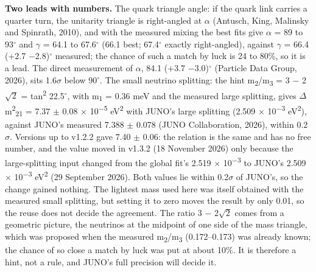 \documentclass[
  11pt,
]{article}
\begin{document}
\textbf{Two leads with numbers.} The quark triangle angle: if the quark link carries a quarter turn, the unitarity triangle is right-angled at \ensuremath{\alpha} (Antusch, King, Malinsky and Spinrath, 2010), and with the measured mixing the best fits give \ensuremath{\alpha} = 89 to 93\ensuremath{^\circ} and \ensuremath{\gamma} = 64.1 to 67.6\ensuremath{^\circ} (66.1 best; 67.4\ensuremath{^\circ} exactly right-angled), against \ensuremath{\gamma} = 66.4 (+2.7 \ensuremath{-}2.8)\ensuremath{^\circ} measured; the chance of such a match by luck is 24 to 80\%, so it is a lead. The direct measurement of \ensuremath{\alpha}, 84.1 (+3.7 \ensuremath{-}3.0)\ensuremath{^\circ} (Particle Data Group, 2026), sits 1.6\ensuremath{\sigma} below 90\ensuremath{^\circ}. The small neutrino splitting: the hint m\textsubscript{2}/m\textsubscript{3} = 3 \ensuremath{-} 2\ensuremath{\sqrt{2}} = tan\textsuperscript{2} 22.5\ensuremath{^\circ}, with m\textsubscript{1} = 0.36 meV and the measured large splitting, gives \ensuremath{\Delta}m\textsuperscript{2}\textsubscript{21} = 7.37 \ensuremath{\pm} 0.08 \ensuremath{\times} 10\textsuperscript{\ensuremath{-}5} eV\textsuperscript{2} with JUNO's large splitting (2.509 \ensuremath{\times} 10\textsuperscript{\ensuremath{-}3} eV\textsuperscript{2}), against JUNO's measured 7.388 \ensuremath{\pm} 0.078 (JUNO Collaboration, 2026), within 0.2\ensuremath{\sigma}. Versions up to v1.2.2 gave 7.40 \ensuremath{\pm} 0.06: the relation is the same and has no free number, and the value moved in v1.3.2 (18 November 2026) only because the large-splitting input changed from the global fit's 2.519 \ensuremath{\times} 10\textsuperscript{\ensuremath{-}3} to JUNO's 2.509 \ensuremath{\times} 10\textsuperscript{\ensuremath{-}3} eV\textsuperscript{2} (29 September 2026). Both values lie within 0.2\ensuremath{\sigma} of JUNO's, so the change gained nothing. The lightest mass used here was itself obtained with the measured small splitting, but setting it to zero moves the result by only 0.01, so the reuse does not decide the agreement. The ratio 3 \ensuremath{-} 2\ensuremath{\sqrt{2}} comes from a geometric picture, the neutrinos at the midpoint of one side of the mass triangle, which was proposed when the measured m\textsubscript{2}/m\textsubscript{3} (0.172--0.173) was already known; the chance of so close a match by luck was put at about 10\%. It is therefore a hint, not a rule, and JUNO's full precision will decide it.
\end{document}
